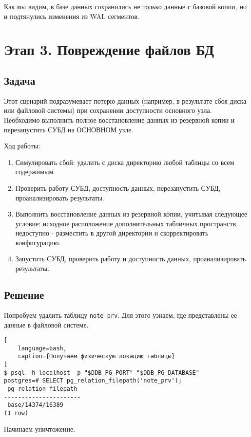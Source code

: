 \documentclass{article}
\begin{document}
Как мы видим, в базе данных сохранились не только данные с базовой копии, но и подтянулись изменения из WAL сегментов.

\section{Этап 3. Повреждение файлов БД}

\subsection{Задача}

Этот сценарий подразумевает потерю данных (например, в результате сбоя диска или файловой системы) при сохранении доступности основного узла. Необходимо выполнить полное восстановление данных из резервной копии и перезапустить СУБД на ОСНОВНОМ узле.

Ход работы:

\begin{enumerate}
    \item Симулировать сбой: удалить с диска директорию любой таблицы со всем содержимым.
    \item Проверить работу СУБД, доступность данных, перезапустить СУБД, проанализировать результаты.
    \item Выполнить восстановление данных из резервной копии, учитывая следующее условие: исходное расположение дополнительных табличных пространств недоступно - разместить в другой директории и скорректировать конфигурацию.
    \item Запустить СУБД, проверить работу и доступность данных, проанализировать результаты.
\end{enumerate}

\subsection{Решение}

Попробуем удалить таблицу \texttt{note\_prv}. Для этого узнаем, где представлены ее данные в файловой системе. 

\begin{lstlisting}[
    language=bash,
    caption={Получаем физическую локацию таблицы}
]
$ psql -h localhost -p "$DDB_PG_PORT" "$DDB_PG_DATABASE"
postgres=# SELECT pg_relation_filepath('note_prv');
 pg_relation_filepath 
----------------------
 base/14374/16389
(1 row)
\end{lstlisting}

Начинаем уничтожение.
\end{document}
